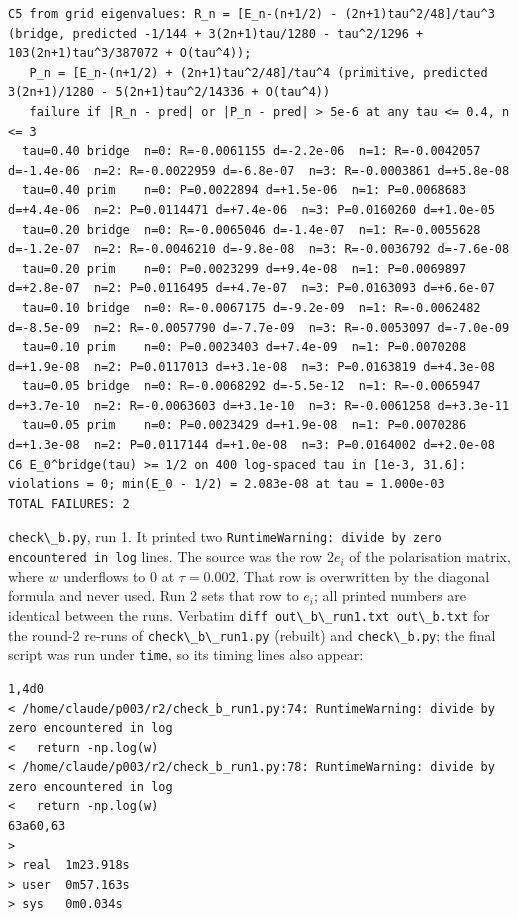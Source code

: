 \documentclass[11pt,a4paper]{article}
\newcommand{\passthrough}[1]{#1}
\begin{document}
\begin{lstlisting}
C5 from grid eigenvalues: R_n = [E_n-(n+1/2) - (2n+1)tau^2/48]/tau^3 (bridge, predicted -1/144 + 3(2n+1)tau/1280 - tau^2/1296 + 103(2n+1)tau^3/387072 + O(tau^4));
   P_n = [E_n-(n+1/2) + (2n+1)tau^2/48]/tau^4 (primitive, predicted 3(2n+1)/1280 - 5(2n+1)tau^2/14336 + O(tau^4))
   failure if |R_n - pred| or |P_n - pred| > 5e-6 at any tau <= 0.4, n <= 3
  tau=0.40 bridge  n=0: R=-0.0061155 d=-2.2e-06  n=1: R=-0.0042057 d=-1.4e-06  n=2: R=-0.0022959 d=-6.8e-07  n=3: R=-0.0003861 d=+5.8e-08
  tau=0.40 prim    n=0: P=0.0022894 d=+1.5e-06  n=1: P=0.0068683 d=+4.4e-06  n=2: P=0.0114471 d=+7.4e-06  n=3: P=0.0160260 d=+1.0e-05
  tau=0.20 bridge  n=0: R=-0.0065046 d=-1.4e-07  n=1: R=-0.0055628 d=-1.2e-07  n=2: R=-0.0046210 d=-9.8e-08  n=3: R=-0.0036792 d=-7.6e-08
  tau=0.20 prim    n=0: P=0.0023299 d=+9.4e-08  n=1: P=0.0069897 d=+2.8e-07  n=2: P=0.0116495 d=+4.7e-07  n=3: P=0.0163093 d=+6.6e-07
  tau=0.10 bridge  n=0: R=-0.0067175 d=-9.2e-09  n=1: R=-0.0062482 d=-8.5e-09  n=2: R=-0.0057790 d=-7.7e-09  n=3: R=-0.0053097 d=-7.0e-09
  tau=0.10 prim    n=0: P=0.0023403 d=+7.4e-09  n=1: P=0.0070208 d=+1.9e-08  n=2: P=0.0117013 d=+3.1e-08  n=3: P=0.0163819 d=+4.3e-08
  tau=0.05 bridge  n=0: R=-0.0068292 d=-5.5e-12  n=1: R=-0.0065947 d=+3.7e-10  n=2: R=-0.0063603 d=+3.1e-10  n=3: R=-0.0061258 d=+3.3e-11
  tau=0.05 prim    n=0: P=0.0023429 d=+1.9e-08  n=1: P=0.0070286 d=+1.3e-08  n=2: P=0.0117144 d=+1.0e-08  n=3: P=0.0164002 d=+2.0e-08
C6 E_0^bridge(tau) >= 1/2 on 400 log-spaced tau in [1e-3, 31.6]: violations = 0; min(E_0 - 1/2) = 2.083e-08 at tau = 1.000e-03
TOTAL FAILURES: 2
\end{lstlisting}

\passthrough{\lstinline!check\_b.py!}, run 1. It printed two
\passthrough{\lstinline!RuntimeWarning: divide by zero encountered in log!}
lines. The source was the row \(2e_i\) of the polarisation matrix, where
\(w\) underflows to 0 at \(\tau=0.002\). That row is overwritten by the
diagonal formula and never used. Run 2 sets that row to \(e_i\); all
printed numbers are identical between the runs. Verbatim
\passthrough{\lstinline!diff out\_b\_run1.txt out\_b.txt!} for the
round-2 re-runs of \passthrough{\lstinline!check\_b\_run1.py!} (rebuilt)
and \passthrough{\lstinline!check\_b.py!}; the final script was run
under \passthrough{\lstinline!time!}, so its timing lines also appear:

\begin{lstlisting}
1,4d0
< /home/claude/p003/r2/check_b_run1.py:74: RuntimeWarning: divide by zero encountered in log
<   return -np.log(w)
< /home/claude/p003/r2/check_b_run1.py:78: RuntimeWarning: divide by zero encountered in log
<   return -np.log(w)
63a60,63
> 
> real  1m23.918s
> user  0m57.163s
> sys   0m0.034s
\end{lstlisting}
\end{document}
